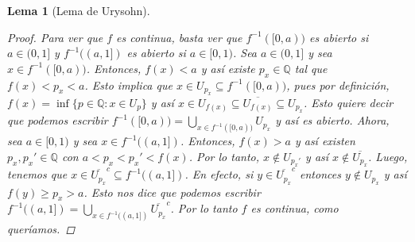 \documentclass[12pt]{book}
\newtheorem{lem}[teo]{Lema}
\theoremstyle{definition}
\newcommand{\QQ}{\mathbb{Q}}
\begin{document}
\begin{lem}[Lema de Urysohn]
\begin{proof}
Para ver que $f$ es continua, basta ver que $f^{-1}([0,a))$ es abierto si $a\in (0,1]$ y $f^{-1}((a,1])$ es abierto si $a\in [0,1)$. Sea $a\in (0,1]$ y sea $x\in f^{-1}([0,a))$. Entonces, $f(x)<a$ y así existe $p_x\in\QQ$ tal que $f(x)<p_x<a$. Esto implica que $x\in U_{p_x}\subseteq f^{-1}([0,a))$, pues por definición, $f(x)=\inf\{p\in\QQ : x\in U_p\}$ y así $x\in U_{f(x)}\subseteq \overline{U_{f(x)}}\subseteq U_{p_x}$. Esto quiere decir que podemos escribir $f^{-1}([0,a)) = \displaystyle\bigcup_{x\in f^{-1}([0,a))} U_{p_x}$ y así es abierto. Ahora, sea $a\in [0,1)$ y sea $x\in f^{-1}((a,1])$. Entonces, $f(x)>a$ y así existen $p_x,p_x'\in\QQ$ con $a<p_x<p_x'<f(x)$. Por lo tanto, $x\notin U_{p_x'}$ y así $x\notin \overline{U_{p_x}}$. Luego, tenemos que $x\in \overline{U_{p_x}}^c\subseteq f^{-1}((a,1])$. En efecto, si $y\in \overline{U_{p_x}}^c$ entonces $y\notin U_{p_x}$ y así $f(y)\geq p_x>a$. Esto nos dice que podemos escribir $f^{-1}((a,1]) = \displaystyle\bigcup_{x\in f^{-1}((a,1])} \overline{U_{p_x}}^c$. Por lo tanto $f$ es continua, como queríamos.

\end{proof}
\end{lem}
\end{document}
